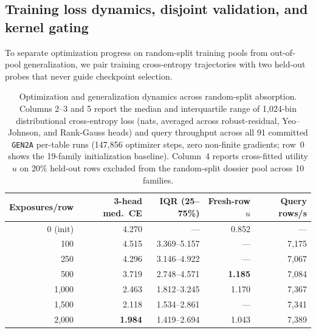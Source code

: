 \subsection{Training loss dynamics, disjoint validation, and kernel gating}
\label{sec:blackhole-dynamics}

To separate optimization progress on random-split training pools from out-of-pool generalization, we pair training
cross-entropy trajectories with two held-out probes that never guide checkpoint selection.

\begin{table}[t]
\centering
\small
\begin{tabular}{@{}rrrrr@{}}
\hline
Exposures/row & 3-head med.\ CE & IQR (25--75\%) & Fresh-row $u$ & Query rows/s \\
\hline
0 (init) & 4.270 & --- & 0.852 & --- \\
100 & 4.515 & 3.369--5.157 & --- & 7,175 \\
250 & 4.296 & 3.146--4.922 & --- & 7,067 \\
500 & 3.719 & 2.748--4.571 & \textbf{1.185} & 7,084 \\
1,000 & 2.463 & 1.812--3.245 & 1.170 & 7,367 \\
1,500 & 2.118 & 1.534--2.861 & --- & 7,341 \\
2,000 & \textbf{1.984} & 1.419--2.694 & 1.043 & 7,389 \\
\hline
\end{tabular}
\caption{Optimization and generalization dynamics across random-split absorption. Columns 2--3 and 5 report the median
and interquartile range of 1,024-bin distributional cross-entropy loss (nats, averaged across robust-residual,
Yeo--Johnson, and Rank-Gauss heads) and query throughput across all 91 committed \texttt{GEN2A} per-table runs
(147,856 optimizer steps, zero non-finite gradients; row~0 shows the 19-family initialization baseline). Column~4
reports cross-fitted utility $u$ on 20\% held-out rows excluded from the random-split dossier pool across 10 families.}
\label{tab:blackhole-loss-curve}
\end{table}


